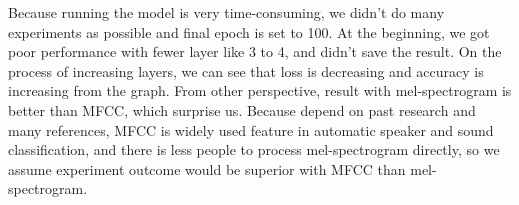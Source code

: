 Because running the model is very time-consuming, we didn't do many experiments as possible and final epoch is set to 100. At the beginning,
we got poor performance with fewer layer like 3 to 4, and didn't save the result. On the process of increasing layers,
we can see that loss is decreasing and accuracy is increasing from the graph. From other perspective, result with mel-spectrogram is 
better than MFCC, which surprise us. Because depend on past research and many references, MFCC is widely used feature in automatic speaker and sound
classification, and there is less people to process mel-spectrogram directly, so we assume experiment outcome would be superior with MFCC than mel-spectrogram.
